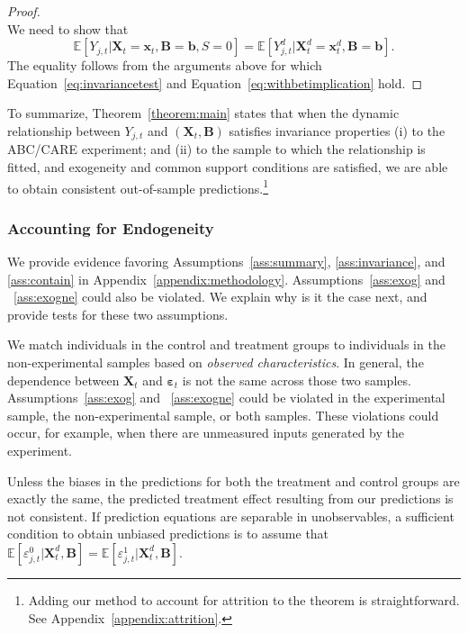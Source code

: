 \noindent \begin{proof}\\
We need to show that
\begin{equation}
\mathbb{E} \left[ Y_{j,t} | \bm{X}_{t} = \bm{x}_{t}, \bm{B} = \bm{b}, S = 0 \right] = \mathbb{E} \left[ Y_{j,t}^d | \bm{X}_{t}^d = \bm{x}_t^d, \bm{B} = \bm{b}  \right].
\end{equation}
The equality follows from the arguments above for which Equation~\eqref{eq:invariancetest} and Equation~\eqref{eq:withbetimplication} hold.
\end{proof}
\doublespacing

To summarize, Theorem~\ref{theorem:main} states that when the dynamic relationship between $Y_{j,t}$ and $\left( \bm{X}_{t}, \bm{B} \right)$ satisfies invariance properties (i) to the ABC/CARE experiment; and (ii) to the sample to which the relationship is fitted, and exogeneity and common support conditions are satisfied, we are able to obtain consistent out-of-sample predictions.\footnote{Adding our method to account for attrition to the theorem is straightforward. See Appendix~\ref{appendix:attrition}.}

\subsubsection{Accounting for Endogeneity}\label{section:accendog}

We provide evidence favoring Assumptions~\ref{ass:summary}, \ref{ass:invariance}, and \ref{ass:contain} in Appendix~\ref{appendix:methodology}. Assumptions~\ref{ass:exog} and ~\ref{ass:exogne} could also be violated. We explain why is it the case next, and provide tests for these two assumptions.

We match individuals in the control and treatment groups to individuals in the non-experimental samples based on \textit{observed characteristics}. In general, the dependence between $\bm{X}_{t}$ and $\bm{\varepsilon}_{t}$ is not the same across those two samples. Assumptions~\ref{ass:exog} and ~\ref{ass:exogne} could be violated in the experimental sample, the non-experimental sample, or both samples. These violations could occur, for example, when there are unmeasured inputs generated by the experiment.

Unless the biases in the predictions for both the treatment and control groups are exactly the same, the predicted treatment effect resulting from our predictions is not consistent. If prediction equations are separable in unobservables, a sufficient condition to obtain unbiased predictions is to assume that $\mathbb{E} \left[ \varepsilon_{j,t}^0 | \bm{X}_{t}^d, \bm{B} \right] = \mathbb{E} \left[ \varepsilon_{j,t}^1 | \bm{X}_{t}^d, \bm{B} \right]$.

